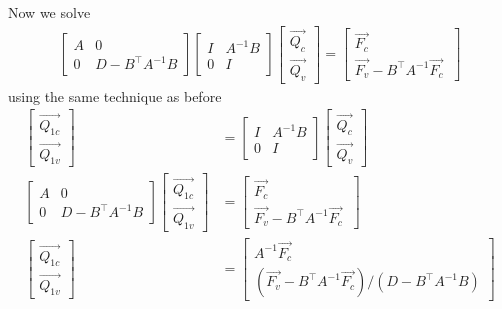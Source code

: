 \documentclass{article}
\begin{document}
Now we solve
\begin{align*}
\begin{bmatrix} 
A & 0 \\ 
0 & D - B^{\top}A^{-1}B
\end{bmatrix}   
\begin{bmatrix} 
I & A^{-1}B \\ 
0 & I
\end{bmatrix}
\begin{bmatrix} 
\vec{Q_{c}} \\ 
\vec{Q_{v}}
\end{bmatrix}
=\begin{bmatrix} 
\vec{F_c} \\ 
\vec{F_v} - B^{\top}A^{-1}\vec{F_c}\
\end{bmatrix} 
\end{align*}
using the same technique as before
\begin{align*}
\begin{bmatrix} 
\vec{Q_{1c}} \\ 
\vec{Q_{1v}}
\end{bmatrix}   
&=
\begin{bmatrix} 
I & A^{-1}B \\ 
0 & I
\end{bmatrix} 
\begin{bmatrix} 
\vec{Q_c} \\ 
\vec{Q_v}
\end{bmatrix}
\\
\begin{bmatrix} 
A & 0 \\ 
0 & D - B^{\top}A^{-1}B
\end{bmatrix}   
\begin{bmatrix} 
\vec{Q_{1c}} \\ 
\vec{Q_{1v}}
\end{bmatrix}
&=
\begin{bmatrix} 
\vec{F_c} \\ 
\vec{F_v} - B^{\top}A^{-1}\vec{F_c}\
\end{bmatrix}\\
\begin{bmatrix} 
\vec{Q_{1c}} \\ 
\vec{Q_{1v}}
\end{bmatrix}   
&=
\begin{bmatrix} 
A^{-1}\vec{F_c} \\ 
(\vec{F_v} - B^{\top}A^{-1}\vec{F_c})/(D - B^{\top}A^{-1}B)
\end{bmatrix}
\end{align*}
\end{document}
